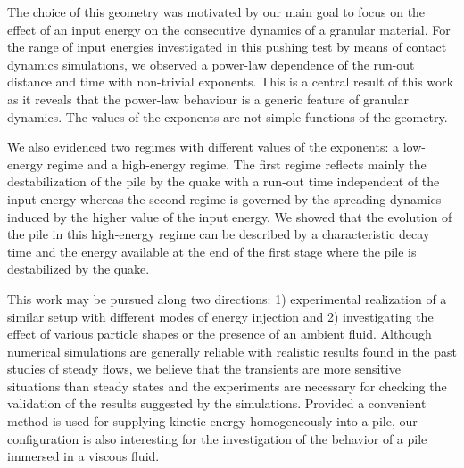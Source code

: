  




The choice of this geometry was motivated by our main goal  to focus on the 
effect of an input energy on the consecutive dynamics of a granular material.
For the range of input energies investigated in this pushing test by means of 
contact dynamics simulations, we observed a power-law dependence of the 
run-out distance and time with non-trivial exponents. This is a central result 
of this work as it reveals that the power-law behaviour is a generic feature of 
granular dynamics. The values of the exponents are not simple functions of 
the geometry. 

We also evidenced two regimes with different values of the exponents: 
a low-energy regime and a high-energy regime. The first regime  
reflects mainly the destabilization of the pile by the quake with a run-out time 
independent of the input energy whereas the second regime is governed by the 
spreading dynamics induced by the higher value of the input energy. We showed 
that the evolution of the pile in this high-energy regime can be described by a 
characteristic decay time and the energy available at the end of the first 
stage where the pile is destabilized by the quake. 

This work may be pursued along two directions: 1) experimental 
realization of a similar setup with different modes of energy injection and 
2) investigating the effect of various particle shapes or the presence of an 
ambient fluid. Although numerical simulations are generally reliable 
with realistic results found in the past studies of steady flows, we believe 
that the transients are more sensitive situations than steady states and the  
experiments are necessary for checking the validation of the results suggested 
by the simulations. Provided a convenient method is used for supplying kinetic 
energy homogeneously into a pile, our configuration is also interesting for 
the investigation of the behavior of a pile immersed in a viscous 
fluid.

